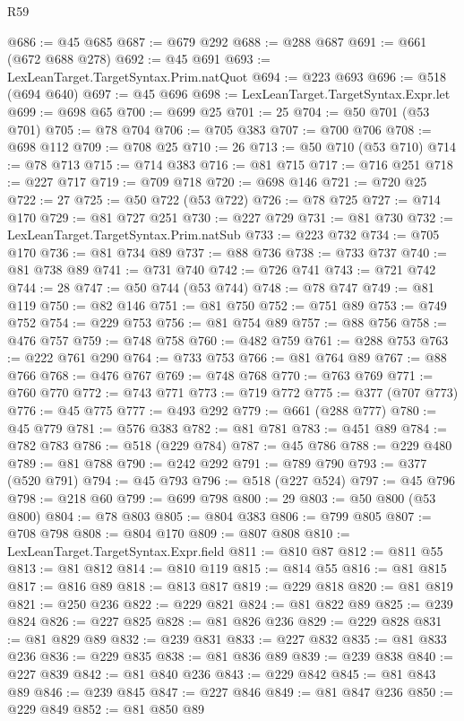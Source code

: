 \begin{lexlean}{R59}
\begin{coremodule}
@686 := @45 @685
@687 := @679 @292
@688 := @288 @687
@691 := @661 (@672 @688 @278)
@692 := @45 @691
@693 := LexLeanTarget.TargetSyntax.Prim.natQuot
@694 := @223 @693
@696 := @518 (@694 @640)
@697 := @45 @696
@698 := LexLeanTarget.TargetSyntax.Expr.let
@699 := @698 @65
@700 := @699 @25
@701 := 25
@704 := @50 @701 (@53 @701)
@705 := @78 @704
@706 := @705 @383
@707 := @700 @706
@708 := @698 @112
@709 := @708 @25
@710 := 26
@713 := @50 @710 (@53 @710)
@714 := @78 @713
@715 := @714 @383
@716 := @81 @715
@717 := @716 @251
@718 := @227 @717
@719 := @709 @718
@720 := @698 @146
@721 := @720 @25
@722 := 27
@725 := @50 @722 (@53 @722)
@726 := @78 @725
@727 := @714 @170
@729 := @81 @727 @251
@730 := @227 @729
@731 := @81 @730
@732 := LexLeanTarget.TargetSyntax.Prim.natSub
@733 := @223 @732
@734 := @705 @170
@736 := @81 @734 @89
@737 := @88 @736
@738 := @733 @737
@740 := @81 @738 @89
@741 := @731 @740
@742 := @726 @741
@743 := @721 @742
@744 := 28
@747 := @50 @744 (@53 @744)
@748 := @78 @747
@749 := @81 @119
@750 := @82 @146
@751 := @81 @750
@752 := @751 @89
@753 := @749 @752
@754 := @229 @753
@756 := @81 @754 @89
@757 := @88 @756
@758 := @476 @757
@759 := @748 @758
@760 := @482 @759
@761 := @288 @753
@763 := @222 @761 @290
@764 := @733 @753
@766 := @81 @764 @89
@767 := @88 @766
@768 := @476 @767
@769 := @748 @768
@770 := @763 @769
@771 := @760 @770
@772 := @743 @771
@773 := @719 @772
@775 := @377 (@707 @773)
@776 := @45 @775
@777 := @493 @292
@779 := @661 (@288 @777)
@780 := @45 @779
@781 := @576 @383
@782 := @81 @781
@783 := @451 @89
@784 := @782 @783
@786 := @518 (@229 @784)
@787 := @45 @786
@788 := @229 @480
@789 := @81 @788
@790 := @242 @292
@791 := @789 @790
@793 := @377 (@520 @791)
@794 := @45 @793
@796 := @518 (@227 @524)
@797 := @45 @796
@798 := @218 @60
@799 := @699 @798
@800 := 29
@803 := @50 @800 (@53 @800)
@804 := @78 @803
@805 := @804 @383
@806 := @799 @805
@807 := @708 @798
@808 := @804 @170
@809 := @807 @808
@810 := LexLeanTarget.TargetSyntax.Expr.field
@811 := @810 @87
@812 := @811 @55
@813 := @81 @812
@814 := @810 @119
@815 := @814 @55
@816 := @81 @815
@817 := @816 @89
@818 := @813 @817
@819 := @229 @818
@820 := @81 @819
@821 := @250 @236
@822 := @229 @821
@824 := @81 @822 @89
@825 := @239 @824
@826 := @227 @825
@828 := @81 @826 @236
@829 := @229 @828
@831 := @81 @829 @89
@832 := @239 @831
@833 := @227 @832
@835 := @81 @833 @236
@836 := @229 @835
@838 := @81 @836 @89
@839 := @239 @838
@840 := @227 @839
@842 := @81 @840 @236
@843 := @229 @842
@845 := @81 @843 @89
@846 := @239 @845
@847 := @227 @846
@849 := @81 @847 @236
@850 := @229 @849
@852 := @81 @850 @89

\end{coremodule}
\end{lexlean}
